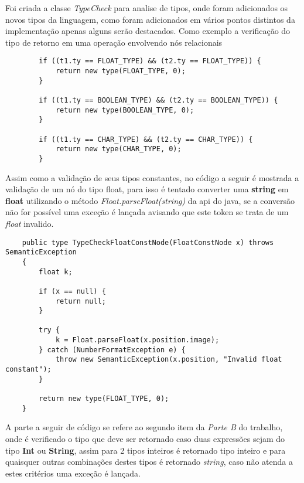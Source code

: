 \documentclass[
	article,			%
	11pt,				%
	oneside,			%
	a4paper,			%
	portuguese,			%
	brazil,				%
	sumario=tradicional
	]{abntex2}
\begin{document}
Foi criada a classe \textit{TypeCheck} para analise de tipos, onde foram adicionados os novos tipos da linguagem, como foram adicionados em vários pontos distintos da implementação apenas alguns serão destacados. Como exemplo a verificação do tipo de retorno em uma operação envolvendo nós relacionais

\begin{lstlisting}
        if ((t1.ty == FLOAT_TYPE) && (t2.ty == FLOAT_TYPE)) {
            return new type(FLOAT_TYPE, 0);
        }

        if ((t1.ty == BOOLEAN_TYPE) && (t2.ty == BOOLEAN_TYPE)) {
            return new type(BOOLEAN_TYPE, 0);
        }

        if ((t1.ty == CHAR_TYPE) && (t2.ty == CHAR_TYPE)) {
            return new type(CHAR_TYPE, 0);
        }
\end{lstlisting}

Assim como a validação de seus tipos constantes, no código a seguir é mostrada a validação de um nó do tipo float, para isso é tentado converter uma \textbf{string} em \textbf{float} utilizando o método \textit{Float.parseFloat(string)} da api do java, se a conversão não for possível uma exceção é lançada avisando que este token se trata de um \textit{float} invalido.

\begin{lstlisting}
    public type TypeCheckFloatConstNode(FloatConstNode x) throws SemanticException
    {
        float k;

        if (x == null) {
            return null;
        }

        try {
            k = Float.parseFloat(x.position.image);
        } catch (NumberFormatException e) {
            throw new SemanticException(x.position, "Invalid float constant");
        }

        return new type(FLOAT_TYPE, 0);
    }
\end{lstlisting}

A parte a seguir de código se refere ao segundo item da \textit{Parte B} do trabalho, onde é verificado o tipo que deve ser retornado caso duas expressões sejam do tipo \textbf{Int} ou \textbf{String}, assim para 2 tipos inteiros é retornado tipo inteiro e para quaisquer outras combinações destes tipos é retornado \textit{string}, caso não atenda a estes critérios uma exceção é lançada.
\end{document}
